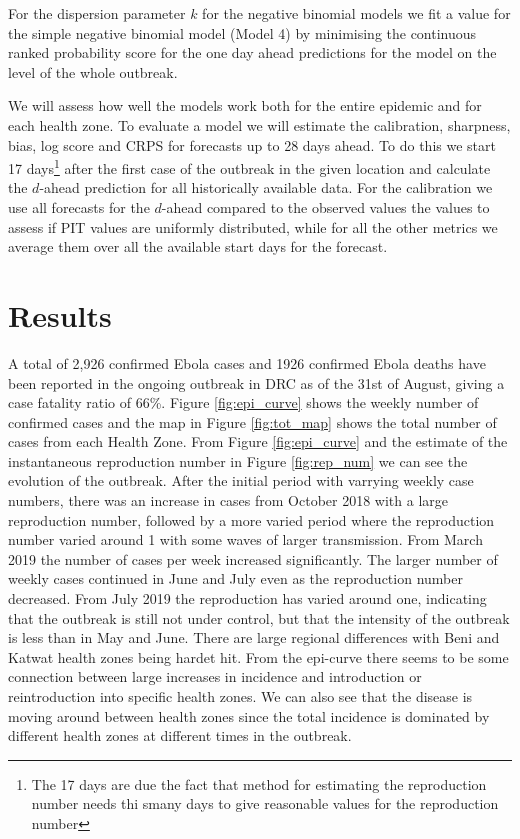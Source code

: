 \documentclass[12pt]{article}
\begin{document}
For the dispersion parameter $k$ for the negative binomial models we fit a value for the simple negative binomial model (Model 4) by minimising the continuous ranked probability score for the one day ahead predictions for the model on the level of the whole outbreak. 

We will assess how well the models work both for the entire epidemic and for each health zone. To evaluate a model we will estimate the calibration, sharpness, bias, log score and CRPS for forecasts up to 28 days ahead. To do this we start 17 days\footnote{The 17 days are due the fact that method for estimating the reproduction number needs thi smany days to give reasonable values for the reproduction number} after the first case of the outbreak in the given location and calculate the $d$-ahead prediction for all historically available data. For the calibration we use all forecasts for the $d$-ahead compared to the observed values the values to assess if PIT values are uniformly distributed, while for all the other metrics we average them over all the available start days for the forecast.



\section{Results}

A total of 2,926 confirmed Ebola cases and 1926 confirmed Ebola deaths have been reported in the ongoing outbreak in DRC as of the 31st of August, giving a case fatality ratio of 66\%. Figure \ref{fig:epi_curve} shows the weekly number of confirmed cases and the map in Figure \ref{fig:tot_map} shows the total number of cases from each Health Zone. From Figure \ref{fig:epi_curve} and the estimate of the instantaneous reproduction number in Figure \ref{fig:rep_num} we can see the evolution of the outbreak. After the initial period with varrying weekly case numbers, there was an increase in cases from October 2018 with a large reproduction number, followed by a more varied period where the reproduction number varied around 1 with some waves of larger transmission. From March 2019 the number of cases per week increased significantly. The larger number of weekly cases continued in June and July even as the reproduction number decreased. From July 2019 the reproduction has varied around one, indicating that the outbreak is still not under control, but that the intensity of the outbreak is less than in May and June. There are large regional differences with Beni and Katwat health zones being hardet hit. From the epi-curve there seems to be some connection between large increases in incidence and introduction or reintroduction into specific health zones. We can also see that the disease is moving around between health zones since the total incidence is dominated by different health zones at different times in the outbreak. 
\end{document}
